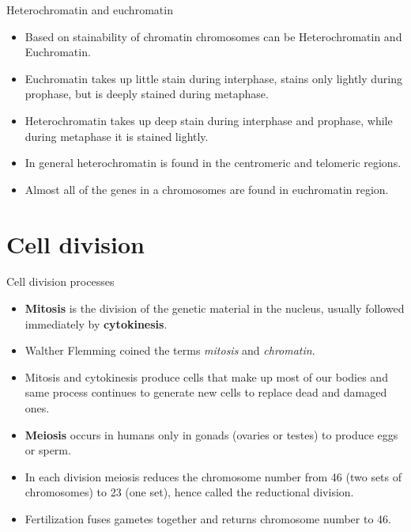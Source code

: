 \documentclass[11pt,ignorenonframetext,aspectratio=169]{beamer}
\providecommand{\tightlist}{%
  \setlength{\itemsep}{0pt}\setlength{\parskip}{0pt}}
\begin{document}
\begin{frame}{Heterochromatin and euchromatin}
\protect\hypertarget{heterochromatin-and-euchromatin}{}
\begin{itemize}
\tightlist
\item
  Based on stainability of chromatin chromosomes can be Heterochromatin
  and Euchromatin.
\item
  Euchromatin takes up little stain during interphase, stains only
  lightly during prophase, but is deeply stained during metaphase.
\item
  Heterochromatin takes up deep stain during interphase and prophase,
  while during metaphase it is stained lightly.
\item
  In general heterochromatin is found in the centromeric and telomeric
  regions.
\item
  Almost all of the genes in a chromosomes are found in euchromatin
  region.
\end{itemize}
\end{frame}

\hypertarget{cell-division}{%
\section{Cell division}\label{cell-division}}

\begin{frame}{Cell division processes}
\protect\hypertarget{cell-division-processes}{}
\begin{itemize}
\tightlist
\item
  \textbf{Mitosis} is the division of the genetic material in the
  nucleus, usually followed immediately by \textbf{cytokinesis}.
\item
  Walther Flemming coined the terms \emph{mitosis} and \emph{chromatin}.
\item
  Mitosis and cytokinesis produce cells that make up most of our bodies
  and same process continues to generate new cells to replace dead and
  damaged ones.
\item
  \textbf{Meiosis} occurs in humans only in gonads (ovaries or testes)
  to produce eggs or sperm.
\item
  In each division meiosis reduces the chromosome number from 46 (two
  sets of chromosomes) to 23 (one set), hence called the reductional
  division.
\item
  Fertilization fuses gametes together and returns chromosome number to
  46.
\end{itemize}
\end{frame}
\end{document}
